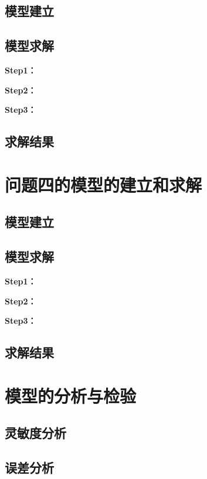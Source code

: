 \documentclass[withoutpreface,bwprint]{cumcmthesis}
\begin{document}
\subsection{模型建立}

\subsection{模型求解}

\textbf{Step1：} 

\textbf{Step2：} 

\textbf{Step3：} 

\subsection{求解结果}


\section{问题四的模型的建立和求解}
\subsection{模型建立}

\subsection{模型求解}

\textbf{Step1：} 

\textbf{Step2：} 

\textbf{Step3：} 

\subsection{求解结果}


\section{模型的分析与检验}

\subsection{灵敏度分析}

\subsection{误差分析}
\end{document}
